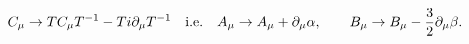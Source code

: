 \begin{equation}
C_\mu \rightarrow T C_\mu T^{-1} - T i\partial_\mu T^{-1}  \quad
{\rm i.e.} \quad A_\mu \rightarrow A_\mu +\partial_\mu \alpha
,\qquad B_\mu \rightarrow B_\mu - \frac{3}{2}\partial_\mu\beta.
\end{equation}


